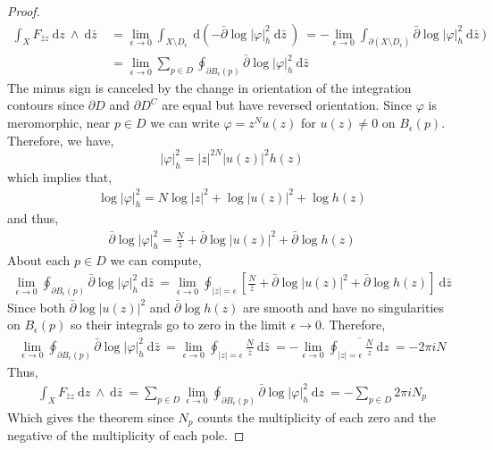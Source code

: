 \documentclass[12pt]{extarticle}
\renewcommand{\d}[1]{\: \mathrm{d}#1 \:}
\theoremstyle{definition}
\begin{document}
\begin{proof}
\begin{align*}
\int_X F_{\bar{z} z} \d{z} \wedge \d{\bar{z}} & = \lim_{\epsilon \to 0} \int_{X \setminus D_{\epsilon}} \d{(-\bar{\partial} \log{|\varphi|_h^2} \d{\bar{z}})} 
= - \lim_{\epsilon \to 0} \int_{\partial (X \setminus D_{\epsilon})}\bar{\partial} \log{|\varphi|_h^2} \d{\bar{z}})
\\
& = \lim_{\epsilon \to 0} \sum_{p \in D} \oint_{\partial B_{\epsilon}(p)} \bar{\partial} \log{|\varphi|_h^2} \d{\bar{z}}
\end{align*}
The minus sign is canceled by the change in orientation of the integration contours since $\partial D$ and $\partial D^C$ are equal but have reversed orientation.
Since $\varphi$ is meromorphic, near $p \in D$ we can write $\varphi = z^N u(z)$ for $u(z) \neq 0$ on $B_{\epsilon}(p)$. Therefore, we have,
\[ |\varphi|_h^2 = |z|^{2N} |u(z)|^2 h(z) \]
which implies that,
\begin{align*}
\log{|\varphi|_h^2} = N \log{|z|^2} + \log{|u(z)|^2} + \log{h(z)} 
\end{align*}
and thus,
\begin{align*}
\bar{\partial} \log{|\varphi|_h^2} = \frac{N}{\bar{z}} + \bar{\partial} \log{|u(z)|^2} + \bar{\partial} \log{h(z)} 
\end{align*}
About each $p \in D$ we can compute,
\begin{align*}
\lim_{\epsilon \to 0} \oint_{\partial B_{\epsilon}(p)} \bar{\partial} \log{|\varphi|_h^2} \d{\bar{z}} = \lim_{\epsilon \to 0} \oint_{|z| = \epsilon} \left[ \frac{N}{\bar{z}} + \bar{\partial} \log{|u(z)|^2} + \bar{\partial} \log{h(z)} \right] \d{\bar{z}}
\end{align*}
Since both $\bar{\partial} \log{|u(z)|^2}$ and $\bar{\partial} \log{h(z)}$ are smooth and have no singularities on $B_{\epsilon}(p)$ so their integrals go to zero in the limit $\epsilon \to 0$. Therefore,
\begin{align*}
\lim_{\epsilon \to 0} \oint_{\partial B_{\epsilon}(p)} \bar{\partial} \log{|\varphi|_h^2} \d{\bar{z}} = \lim_{\epsilon \to 0} \oint_{|z| = \epsilon} \frac{N}{\bar{z}} \d{\bar{z}} = -\lim_{\epsilon \to 0} \overline{\oint_{|z| = \epsilon} \frac{N}{z} \d{z} } = - 2 \pi i N
\end{align*}
Thus,
\begin{align*}
\int_X F_{\bar{z} z} \d{z} \wedge \d{\bar{z}} = \sum_{p \in D} \lim_{\epsilon \to 0} \oint_{\partial B_{\epsilon}(p)} \bar{\partial} \log{|\varphi|_h^2} \d{z}  = - \sum_{p \in D} 2 \pi i N_p
\end{align*}
Which gives the theorem since $N_p$ counts the multiplicity of each zero and the negative of the multiplicity of each pole. 
\end{proof}
\end{document}
